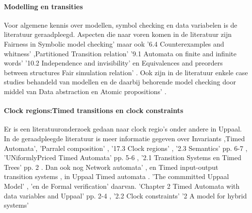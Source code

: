 \documentclass{article}
\begin{document}
	\paragraph{Modelling en transities}
	Voor algemene kennis over modellen, symbol checking en data variabelen is de literatuur geraadpleegd.
	\cite{clarkmodelchecking}
	\cite[p.~14]{clarkmodelchecking}
	\cite[p.~16--20]{clarkmodelchecking}
	\cite[p.~22-24]{clarkmodelchecking}
	\cite[p.27--29]{clarkmodelchecking}
	\cite[p.~30]{clarkmodelchecking}
	\cite[p.~32]{clarkmodelchecking}
	\cite[p.~40--41]{clarkmodelchecking}
	\cite[p.~46--49]{clarkmodelchecking}
	Aspecten die naar voren komen in de literatuur zijn Fairness in Symbolic model checking'
	\cite[p.~68--71]{clarkmodelchecking}
	maar ook '6.4 Counterexamples and whitness'
	\cite[p.~71]{clarkmodelchecking}
	,Partitioned Transition relation'
	\cite[p.~79]{clarkmodelchecking}
	'9.1 Automata on finite and infinite words'
	\cite[p.~121]{clarkmodelchecking}
	'10.2 Independence and invisibility'
	\cite[p.~144--145]{clarkmodelchecking}
	en Equivalences and preorders between structures Fair simulation relation'
	\cite[p.~178]{clarkmodelchecking}.
	Ook zijn in de literatuur enkele case studies behandeld van modellen en de daarbij behorende model checking
	\cite[p.~197]{clarkmodelchecking}
	door middel van Data abstraction en Atomic propositions'
	\cite[p.~199--203]{clarkmodelchecking}.
	
	
	\paragraph{Clock regions:Timed transitions en clock constraints}
	Er is een literatuuronderzoek gedaan naar clock regio's onder andere in Uppaal.
	In de geraadpleegde literatuur is meer informatie gegeven over Invariants
	\cite[p.~215--236]{clarkmodelchecking},Timed Automata'\cite[p.~265--268]{clarkmodelchecking},
	'Parralel composition'
	\cite[p.~268]{clarkmodelchecking},
	'17.3 Clock regions'
	\cite[p.~274--281]{clarkmodelchecking}
	\cite{LIPIcs-TIME-2021-12},
	'2.3 Semantics' pp. 6-7 
	\cite[p.~6--7]{audioSemanticsBengtsson},
	'UNiformlyPriced Timed Automata' pp. 5-6
	\cite[p.~5--6]{guidingAutomataBberm},
	'2.1 Transition Systems en Timed Trees' pp. 2
	\cite[p.~2]{gearTransitionLindahl1}.
	Dan ook nog Network automata' 
	\cite[p.~3]{gearTransitionLindahl1}
	\cite[p.~2]{martinelliScada},
	en Timed input-output transition systems
	\cite[p.~2]{IgbalReconstructurintTransition2},
	in Uppaal Timed automata 
	\cite[p.~3]{IgbalReconstructurintTransition2}
	\cite[p.~3]{huangVerficationStoch}.
	'The commmitted Uppaal Model'  
	\cite{bengtssonUppaalVerification},
	'en de Formal verification' 
	\cite[p.~5]{pranaliVerificationWaterLevel}
	\cite{alexandreUppaalDefinition}
	\cite{behzadEvalQOS} daarvan.
	'Chapter 2 Timed Automata with data variables and Uppaal' pp. 2-4
	\cite[p.~4]{behzadVariablesQoS}
	\cite{alur}
	\cite{alurDenseRealTime},
	'2.2 Clock constraints'
	\cite{alurSystemClok}
	'2 A model for hybrid systems'
	\cite{alurModelHybrid} \\
	
\end{document}
